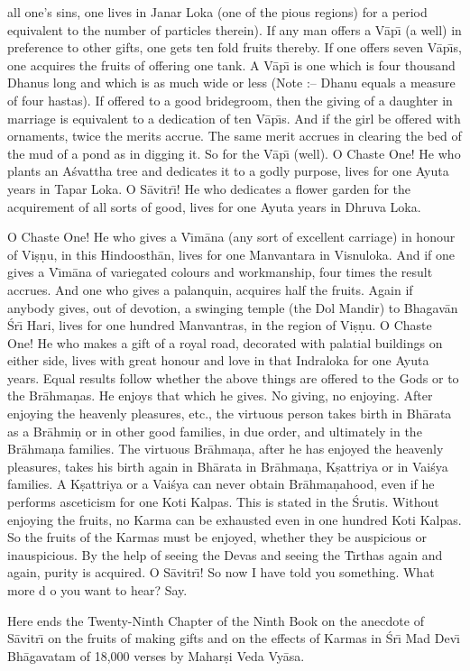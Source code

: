 all one's sins, one lives in Janar Loka (one of the pious regions) for a period equivalent to the number of particles therein). If any man offers a V\=ap\={\i} (a well) in preference to other gifts, one gets ten fold fruits thereby. If one offers seven V\=ap\={\i}s, one acquires the fruits of offering one tank. A V\=ap\={\i} is one which is four thousand Dhanus long and which is as much wide or less (Note :-- Dhanu equals a measure of four hastas). If offered to a good bridegroom, then the giving of a daughter in marriage is equivalent to a dedication of ten V\=ap\={\i}s. And if the girl be offered with ornaments, twice the merits accrue. The same merit accrues in clearing the bed of the mud of a pond as in digging it. So for the V\=ap\={\i} (well). O Chaste One! He who plants an A\'svattha tree and dedicates it to a godly purpose, lives for one Ayuta years in Tapar Loka. O S\=avitr\={\i}! He who dedicates a flower garden for the acquirement of all sorts of good, lives for one Ayuta years in Dhruva Loka.

O Chaste One! He who gives a V\={\i}m\=ana (any sort of excellent carriage) in honour of Vi\d{s}\d{n}u, in this Hindoosth\=an, lives for one Manvantara in Visnuloka. And if one gives a V\={\i}m\=ana of variegated colours and workmanship, four times the result accrues. And one who gives a palanquin, acquires half the fruits. Again if anybody gives, out of devotion, a swinging temple (the Dol Mandir) to Bhagav\=an \'Sr\={\i} Hari, lives for one hundred Manvantras, in the region of Vi\d{s}\d{n}u. O Chaste One! He who makes a gift of a royal road, decorated with palatial buildings on either side, lives with great honour and love in that Indraloka for one Ayuta years. Equal results follow whether the above things are offered to the Gods or to the Br\=ahma\d{n}as. He enjoys that which he gives. No giving, no enjoying. After enjoying the heavenly pleasures, etc., the virtuous person takes birth in Bh\=arata as a Br\=ahmi\d{n} or in other good families, in due order, and ultimately in the Br\=ahma\d{n}a families. The virtuous Br\=ahma\d{n}a, after he has enjoyed the heavenly pleasures, takes his birth again in Bh\=arata in Br\=ahma\d{n}a, K\d{s}attriya or in Vai\'sya families. A K\d{s}attriya or a Vai\'sya can never obtain Br\=ahma\d{n}ahood, even if he performs asceticism for one Koti Kalpas. This is stated in the \'Srutis. Without enjoying the fruits, no Karma can be exhausted even in one hundred Koti Kalpas. So the fruits of the Karmas must be enjoyed, whether they be auspicious or inauspicious. By the help of seeing the Devas and seeing the T\={\i}rthas again and again, purity is acquired. O S\=avitr\={\i}! So now I have told you something. What more d o you want to hear? Say.

Here ends the Twenty-Ninth Chapter of the Ninth Book on the anecdote of S\=avitr\={\i} on the fruits of making gifts and on the effects of Karmas in \'Sr\={\i} Mad Dev\={\i} Bh\=agavatam of 18,000 verses by Mahar\d{s}i Veda Vy\=asa.



